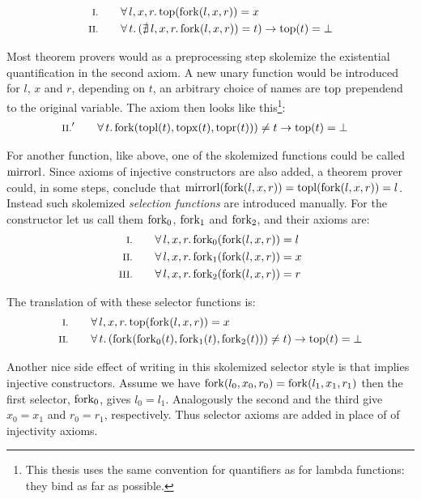 \begin{align*}
\rom{1} \qquad & \faaa{l}{x}{r} \fn{top}(\fn{fork}(l,x,r)) \eq x \\
\rom{2} \qquad & \fa{t}         (\nexxx{l}{x}{r} \fn{fork}(l,x,r)) \eq t) \rightarrow \fn{top}(t) \eq \bot
\end{align*}

Most theorem provers would as a preprocessing step skolemize the existential quantification in the second
axiom. A new unary function would be introduced for $l$, $x$ and $r$,
depending on $t$, an arbitrary choice of names are $\mathrm{top}$ prependend
to the original variable. The axiom then looks like
this\footnote{This thesis uses the same convention for quantifiers as
  for lambda functions: they bind as far as possible.}:
\begin{align*}
\rom{2}' \qquad & \fa{t} \fn{fork}(\fn{topl}(t),\fn{topx}(t),\fn{topr}(t))) \neq t \rightarrow \fn{top}(t) \eq \bot
\end{align*}

For another function, like  above, one of the skolemized
functions could be called $\mathrm{mirrorl}$. Since axioms of injective
constructors are also added, a theorem prover could, in some steps,
conclude that $\mathrm{mirrorl}(\mathrm{fork}(l,x,r)) =
\mathrm{topl}(\mathrm{fork}(l,x,r)) = l$. Instead such skolemized
\emph{selection functions} are introduced manually.  For the 
constructor let us call them $\mathrm{fork_0}$, $\mathrm{fork_1}$ and
$\mathrm{fork_2}$, and their axioms are:
\begin{align*}
\rom{1} \qquad \faaa{l}{x}{r} \fn{fork_{0}}(\fn{fork}(l,x,r)) & \eq l \\
\rom{2} \qquad \faaa{l}{x}{r} \fn{fork_{1}}(\fn{fork}(l,x,r)) & \eq x \\
\rom{3} \qquad \faaa{l}{x}{r} \fn{fork_{2}}(\fn{fork}(l,x,r)) & \eq r
\end{align*}

\noindent
The translation of  with these selector functions is:
\begin{align*}
\rom{1} \qquad & \faaa{l}{x}{r} \fn{top}(\fn{fork}(l,x,r)) \eq x \\
\rom{2} \qquad & \fa{t}         (\fn{fork}(\fn{fork_0}(t),\fn{fork_1}(t),\fn{fork_2}(t))) \neq t) \rightarrow \fn{top}(t) \eq \bot
\end{align*}

\noindent
Another nice side effect of writing in this skolemized selector style
is that implies injective constructors. Assume we have
$\mathrm{fork}(l_0,x_0,r_0)=\mathrm{fork}(l_1,x_1,r_1)$ then the first
selector, $\mathrm{fork_0}$, gives $l_0=l_1$. Analogously the second and
the third give $x_0=x_1$ and $r_0=r_1$, respectively. Thus selector
axioms are added in place of of injectivity axioms.

